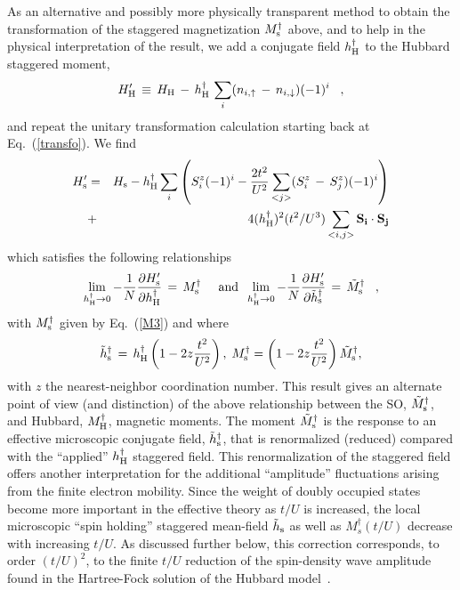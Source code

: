\documentclass[aps,prb,twocolumn,superscriptaddress,
               amsmath]{revtex4}
\renewcommand{\=}{\,=\,}
\newcommand{\+}{\,+\,}
\renewcommand{\-}{\,-\,}
\begin{document}
As an alternative  and possibly more physically transparent 
method to obtain the transformation of the
staggered magnetization $M_{\rm s}^\dagger$ above, and to help
in the physical interpretation of the result,
we add a conjugate field $h_{\rm H}^\dagger $ to the Hubbard staggered
 moment,
\begin{equation}
H_{\rm H}'\,\equiv\, H_{\rm H} \,-\,
h^\dagger_{\rm H}\,\sum_{i} (n_{i,\uparrow}\,-\,n_{i,\downarrow})(-1)^i	\;\;\; ,
\end{equation}
and repeat the unitary transformation calculation starting back at
Eq.~(\ref{transfo}). We find
\begin{eqnarray}
H' _{\rm s} & =&
H_{\rm s}
- h^\dagger_{\rm H} \sum_i \left ( S_i^z(-1)^i -\frac{2t^2}{U^2} \sum_{<j>}
(S_i^z \,-\, S_j^z) (-1)^i
\right )
 \nonumber
\\
&+& 4 (h^\dagger_{\rm H})^2(t^2/U^3) \sum_{<i,j>} {\bf S_i}\cdot {\bf S_j}
\end{eqnarray}
 which satisfies the following relationships
\begin{equation}
\lim_{h^\dagger_{\rm H}\rightarrow 0} - {1\over{N}}\frac{\partial
{H'_{\rm s}}}{\partial h^\dagger_{\rm H}}\,=\, M^\dagger_{\rm s}
\;\;\; \;\;{\rm and}\;\; \lim_{h^\dagger_{\rm H}\rightarrow 0} -
{1\over{N}}\frac{\partial {H'_{\rm s}}}{\partial \tilde
h^\dagger_{\rm s}} \,=\, \tilde M^\dagger_{\rm s} \;\;\; ,
\end{equation}
with $M^\dagger_{\rm s}$ given by Eq.~(\ref{M3})
and where
\begin{equation}\label{heff}
\tilde h^\dagger_{\rm s} \,=\, h^\dagger_{\rm H} \left(1-{2z}\frac{t^2}{U^2}\right), \;
M^\dagger_{\rm s}=\left(1-2z\frac{t^2}{U^2}\right)\tilde M^\dagger_{\rm s},
\end{equation}
with $z$ the nearest-neighbor coordination number. This result gives an alternate point of view (and distinction) of the above relationship between the SO, $\tilde M^\dagger_{\rm s}$,  and Hubbard, $M^\dagger_{\rm H}$, magnetic moments. The moment $\tilde M^\dagger_{\rm s}$ is the response to an effective microscopic conjugate field, $\tilde h^\dagger_{\rm s}$, that is renormalized (reduced) compared with the ``applied'' $h_{\rm H}^\dagger$ staggered  field.
This renormalization of the staggered field
offers another interpretation
for the additional ``amplitude'' fluctuations arising from the
finite electron mobility. Since the weight of doubly
occupied states become more important in the effective theory 
as $t/U$ is increased, 
the local microscopic 
``spin holding'' staggered mean-field $\tilde h_{\rm s}$
as well as $M_s^\dagger(t/U)$ decrease with increasing $t/U$.
As discussed further below, this correction corresponds, to order $(t/U)^2$, to the finite $t/U$ reduction of the spin-density wave amplitude found in the Hartree-Fock solution of the Hubbard model~\cite{Schrieffer-RPA}.
\end{document}
